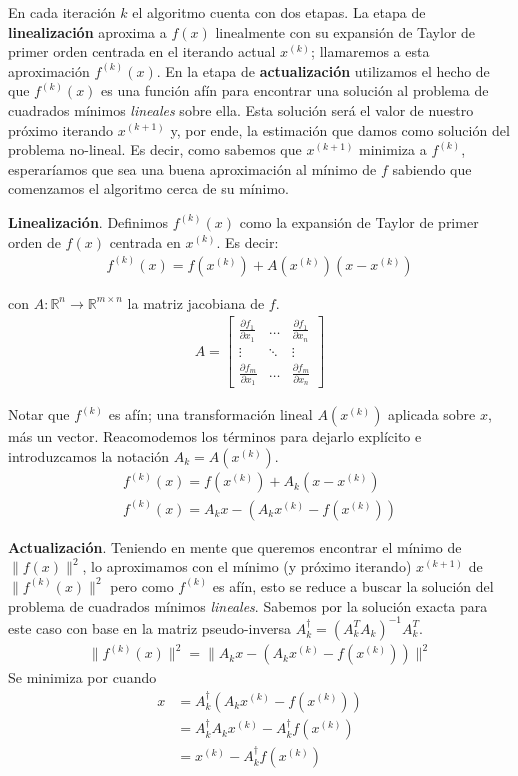 \documentclass[ twoside,openright,titlepage,numbers=noenddot,%
                headinclude,footinclude,cleardoublepage=empty,abstract=on,
                BCOR=-5mm,paper=a4,fontsize=11pt
                ]{scrreprt}
\newcommand{\R}{\mathbb{R}}
\begin{document}
En cada iteración \(k\) el algoritmo cuenta con dos etapas. La etapa de
\textbf{linealización} aproxima a \(f(x)\) linealmente con su expansión
de Taylor de primer orden centrada en el iterando actual \(x^{(k)}\);
llamaremos a esta aproximación \(f^{(k)}(x)\). En la etapa de
\textbf{actualización} utilizamos el hecho de que \(f^{(k)}(x)\) es una
función afín para encontrar una solución al problema de cuadrados
mínimos \emph{lineales} sobre ella. Esta solución será el valor de
nuestro próximo iterando \(x^{(k+1)}\) y, por ende, la estimación que
damos como solución del problema no-lineal. Es decir, como sabemos que
\(x^{(k+1)}\) minimiza a \(f^{(k)}\), esperaríamos que sea una buena
aproximación al mínimo de \(f\) sabiendo que comenzamos el algoritmo
cerca de su mínimo.

\textbf{Linealización}. Definimos \(f^{(k)}(x)\) como la expansión de
Taylor de primer orden de \(f(x)\) centrada en \(x^{(k)}\). Es decir:
\begin{align}
f^{(k)}(x) = f(x^{(k)}) + A(x^{(k)}) (x - x^{(k)})
\end{align}

con \(A: \R^n \rightarrow \R^{m \times n}\) la matriz jacobiana de
\(f\). \begin{align}
A = \begin{bmatrix}
  \frac{\partial f_1}{\partial x_1} & \dots & \frac{\partial f_1}{\partial x_n} \\
  \vdots & \ddots & \vdots \\
  \frac{\partial f_m}{\partial x_1} & \dots & \frac{\partial f_m}{\partial x_n}
\end{bmatrix}
\end{align}

Notar que \(f^{(k)}\) es afín; una transformación lineal \(A(x^{(k)})\)
aplicada sobre \(x\), más un vector. Reacomodemos los términos para
dejarlo explícito e introduzcamos la notación \(A_k = A(x^{(k)})\).
\begin{align}
f^{(k)}(x) = f(x^{(k)}) + A_k (x - x^{(k)}) \\
f^{(k)}(x) = A_k x - (A_k x^{(k)} - f(x^{(k)}))
\end{align}

\textbf{Actualización}. Teniendo en mente que queremos encontrar el
mínimo de \(\| f(x) \| ^ 2\), lo aproximamos con el mínimo (y próximo
iterando) \(x^{(k+1 )}\) de \(\| f^{(k)}(x) \| ^ 2\) pero como
\(f^{(k)}\) es afín, esto se reduce a buscar la solución del problema de
cuadrados mínimos \emph{lineales}. Sabemos por
 la solución exacta para este caso con base
en la matriz pseudo-inversa \(A_k^{\dagger} = (A_k^T A_k)^{-1} A_k^T\).
\begin{align}
\| f^{(k)}(x) \| ^ 2 = \| A_k x - (A_k x^{(k)} - f(x^{(k)})) \|^2
\end{align} Se minimiza por  cuando
\begin{align}
x &= A_k^{\dagger} (A_k x^{(k)} - f(x^{(k)})) \\
&=A_k^{\dagger} A_k x^{(k)} - A_k^{\dagger} f(x^{(k)}) \\
&= x^{(k)} - A_k^{\dagger} f(x^{(k)})
\end{align}
\end{document}
